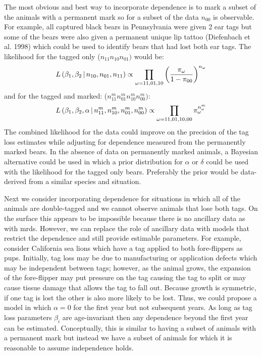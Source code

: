 \documentclass{article}
\begin{document}
The most obvious and best way to incorporate dependence is to mark a subset 
of the animals with a permanent mark so for a subset of the data $n_{00}$ is 
observable. For example, all captured black bears in Pennsylvania were given 
2 ear tags but some of the bears were also given a permanent unique lip 
tattoo (Diefenbach et al. 1998) which could be used to identify bears that 
had lost both ear tags. The likelihood for the tagged only 
($n_{11}n_{10}n_{01})$ would be:
\[
L\left( {\beta_{1},\beta_{2}}\thinspace\vert\thinspace 
{n_{10},n_{01},n_{11}}\right) \propto \prod\limits_{\omega =11,01,10} \left( 
\frac{\pi_{\omega }}{1-\pi_{00}} \right)^{n_{\omega }} 
\]
and for the tagged and marked: ($n_{11}^{m}n_{01}^{m}n_{10}^{m}n_{00}^{m})$: 
\[
L\left( {\beta_{1},\beta_{2},\alpha }\thinspace\vert\thinspace 
{n_{11}^{m},n_{10}^{m},n_{01}^{m},n_{00}^{m}}\right) \propto 
\prod\limits_{\omega =11,01,10,00} \pi_{\omega }^{n_{\omega }^{m}} 
\]
The combined likelihood for the data could improve on the precision of the 
tag loss estimates while adjusting for dependence measured from the 
permanently marked bears. In the absence of data on permanently marked 
animals, a Bayesian alternative could be used in which a prior distribution 
for $\alpha $ or $\delta $ could be used with the likelihood for the tagged 
only bears. Preferably the prior would be data-derived from a similar 
species and situation. 

Next we consider incorporating dependence for situations in which all of the 
animals are double-tagged and we cannot observe animals that lose both tags. 
On the surface this appears to be impossible because there is no ancillary 
data as with mrds. However, we can replace the role of ancillary data with 
models that restrict the dependence and still provide estimable parameters. 
For example, consider California sea lions which have a tag applied to both 
fore-flippers as pups. Initially, tag loss may be due to manufacturing or 
application defects which may be independent between tags; however, as the 
animal grows, the expansion of the fore-flipper may put pressure on the tag 
causing the tag to split or may cause tissue damage that allows the tag to 
fall out. Because growth is symmetric, if one tag is lost the other is also 
more likely to be lost. Thus, we could propose a model in which $\alpha 
=$0 for the first year but not subsequent years. As long as tag loss 
parameters $\beta_{i}$ are age-invariant then any dependence beyond the 
first year can be estimated. Conceptually, this is similar to having a 
subset of animals with a permanent mark but instead we have a subset of 
animals for which it is reasonable to assume independence holds. 
\end{document}
